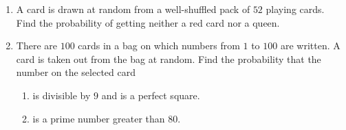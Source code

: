\documentclass{article}                                         %
\begin{document}
                                                                                                                \begin{enumerate}
    \item A card is drawn at random from a well-shuffled pack of $52$ playing cards. Find the probability of getting neither a red card nor a queen.

\item There are $100$ cards in a bag on which numbers from $1$ to $100$ are written. A card is taken out from the bag at random. Find the probability that the number on the selected card
    \begin{enumerate}
        \item is divisible by $9$ and is a perfect square.
        \item is a prime number greater than $80$.                  \end{enumerate}
								\end{enumerate}
\end{document}
